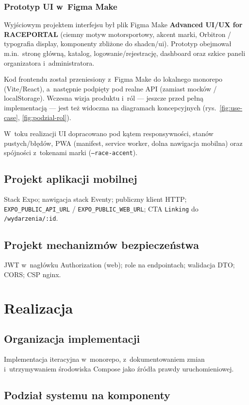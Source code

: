 \documentclass{sprz}
\begin{document}
\subsection{Prototyp UI w~Figma Make}  
Wyjściowym projektem interfejsu był plik Figma Make \textbf{Advanced UI/UX for RACEPORTAL} (ciemny motyw motorsportowy, akcent marki, Orbitron / typografia display, komponenty zbliżone do shadcn/ui). Prototyp obejmował m.in.\ stronę główną, katalog, logowanie/rejestrację, dashboard oraz szkice paneli organizatora i~administratora.  
  
Kod frontendu został przeniesiony z~Figma Make do lokalnego monorepo (Vite/React), a~następnie podpięty pod realne API (zamiast mocków / localStorage). Wczesna wizja produktu i~ról --- jeszcze przed pełną implementacją --- jest też widoczna na diagramach koncepcyjnych (rys.~\ref{fig:use-case}, \ref{fig:podzial-rol}).  
  
W~toku realizacji UI dopracowano pod kątem responsywności, stanów pustych/błędów, PWA (manifest, service worker, dolna nawigacja mobilna) oraz spójności z~tokenami marki (\texttt{--race-accent}).  
  
\section{Projekt aplikacji mobilnej}  
Stack Expo; nawigacja stack Eventy; publiczny klient HTTP; \texttt{EXPO\_PUBLIC\_API\_URL} / \texttt{EXPO\_PUBLIC\_WEB\_URL}; CTA \texttt{Linking} do \texttt{/wydarzenia/:id}.  
  
\section{Projekt mechanizmów bezpieczeństwa}  
JWT w~nagłówku Authorization (web); role na endpointach; walidacja DTO; CORS; CSP nginx.  
  
\chapter{Realizacja}  
\section{Organizacja implementacji}  
Implementacja iteracyjna w~monorepo, z~dokumentowaniem zmian i~utrzymywaniem środowiska Compose jako źródła prawdy uruchomieniowej.  
  
\section{Podział systemu na komponenty}  
\end{document}
